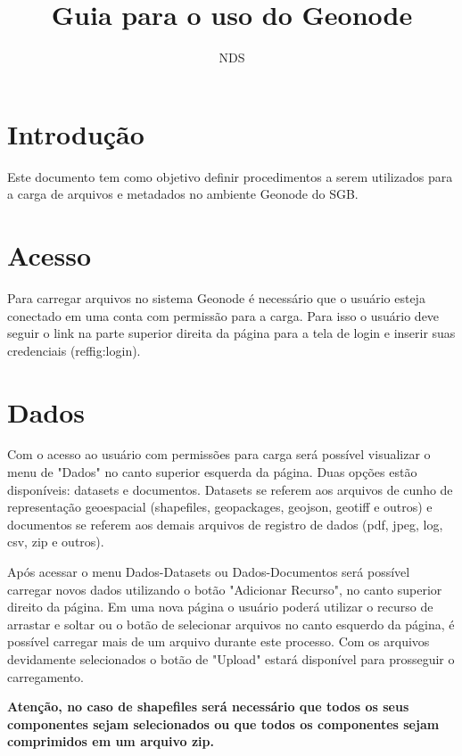 \documentclass[12pt]{article}
\title{Guia para o uso do Geonode}
\author{NDS\inst{1}}
\begin{document}
 

\maketitle


\section{Introdução}

Este documento tem como objetivo definir procedimentos a serem utilizados para
a carga de arquivos e metadados no ambiente Geonode do SGB.

\section{Acesso} \label{sec:firstpage}

Para carregar arquivos no sistema Geonode é necessário que o usuário esteja
conectado em uma conta com permissão para a carga. Para isso o usuário deve
seguir o link na parte superior direita da página para a tela de login e
inserir suas credenciais (ref{fig:login}).

\section{Dados}

Com o acesso ao usuário com permissões para carga será possível visualizar o
menu de "Dados" no canto superior esquerda da página. Duas opções estão
disponíveis: datasets e documentos. Datasets se referem aos arquivos de cunho
de representação geoespacial (shapefiles, geopackages, geojson, geotiff e
outros) e documentos se referem aos demais arquivos de registro de dados (pdf,
jpeg, log, csv, zip e outros).

Após acessar o menu Dados-Datasets ou Dados-Documentos será possível carregar
novos dados utilizando o botão "Adicionar Recurso", no canto superior direito
da página. Em uma nova página o usuário poderá utilizar o recurso de arrastar e
soltar ou o botão de selecionar arquivos no canto esquerdo da página, é
possível carregar mais de um arquivo durante este processo. Com os arquivos
devidamente selecionados o botão de "Upload" estará disponível para prosseguir
o carregamento. 

\textbf{Atenção, no caso de shapefiles será necessário que todos os seus
componentes sejam selecionados ou que todos os componentes sejam comprimidos em
um arquivo zip.}
\end{document}
